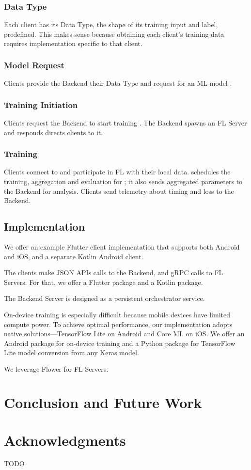 \documentclass[letterpaper]{article} %
\begin{document}
\subsubsection{Data Type}
Each client has its Data Type, the shape of its training input and label,
predefined.
This makes sense because obtaining each client's training data requires
implementation specific to that client.

\subsubsection{Model Request}
Clients provide the Backend their Data Type and request for an ML model \model.

\subsubsection{Training Initiation}
Clients request the Backend to start training \model.
The Backend spawns an FL Server \fs{} and responds directs clients to it.

\subsubsection{Training}
Clients connect to \fs{} and participate in FL with their local data.
\fs{} schedules the training, aggregation and evaluation for \model;
it also sends aggregated parameters to the Backend for analysis.
Clients send telemetry about timing and loss to the Backend.

\subsection{Implementation}

We offer an example Flutter client implementation that supports both Android and
iOS, and a separate Kotlin Android client.

The clients make JSON APIs calls to the Backend,
and gRPC calls to FL Servers.
For that, we offer a Flutter package and a Kotlin package.

The Backend Server is designed as a persistent orchestrator service.

On-device training is especially difficult because mobile devices have limited
compute power.
To achieve optimal performance, our implementation adopts native
solutions---TensorFlow Lite on Android and Core ML on iOS.
We offer an Android package for on-device training and a Python package for
TensorFlow Lite model conversion from any Keras model.

We leverage Flower \cite{beutel2020flower} for FL Servers.

\section{Conclusion and Future Work}

\appendix

\section*{Acknowledgments}
TODO

\bigskip


\end{document}
